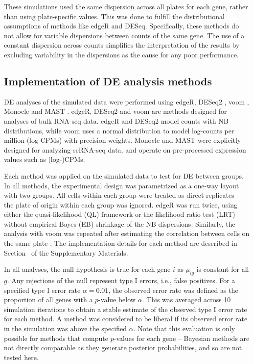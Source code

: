 \documentclass[oupdraft]{bio}
\begin{document}
These simulations used the same dispersion across all plates for each gene, rather than using plate-specific values.
This was done to fulfill the distributional assumptions of methods like edgeR and DESeq.
Specifically, these methods do not allow for variable dispersions between counts of the same gene.
The use of a constant dispersion across counts simplifies the interpretation of the results by excluding variability in the dispersions as the cause for any poor performance.

\subsection{Implementation of DE analysis methods}
DE analyses of the simulated data were performed using edgeR, DESeq2 \citep{love2014moderated}, voom \citep{law2014voom}, Monocle and MAST \citep{finak2015mast}.
edgeR, DESeq2 and voom are methods designed for analyses of bulk RNA-seq data.
edgeR and DESeq2 model counts with NB distributions, while voom uses a normal distribution to model log-counts per million (log-CPMs) with precision weights.
Monocle and MAST were explicitly designed for analyzing scRNA-seq data, and operate on pre-processed expression values such as (log-)CPMs.

Each method was applied on the simulated data to test for DE between groups. 
In all methods, the experimental design was parametrized as a one-way layout with two groups.
All cells within each group were treated as direct replicates -- the plate of origin within each group was ignored.
edgeR was run twice, using either the quasi-likelihood (QL) framework \citep{lund2012detecting} 
    or the likelihood ratio test (LRT) \citep{mccarthy2012differential} without empirical Bayes (EB) shrinkage of the NB dispersions.
Similarly, the analysis with voom was repeated after estimating the correlation between cells on the same plate \citep{smyth2005use}.
The implementation details for each method are described in Section~\suppimplementation{} of the Supplementary Materials.

In all analyses, the null hypothesis is true for each gene $i$ as $\mu_{ig}$ is constant for all $g$.
Any rejections of the null represent type I errors, i.e., false positives.
For a specified type I error rate $\alpha = 0.01$, the observed error rate was defined as the proportion of all genes with a $p$-value below $\alpha$.
This was averaged across 10 simulation iterations to obtain a stable estimate of the observed type I error rate for each method. 
A method was considered to be liberal if its observed error rate in the simulation was above the specified $\alpha$.
Note that this evaluation is only possible for methods that compute $p$-values for each gene -- 
    Bayesian methods \citep{kharchenko2014bayesian} are not directly comparable as they generate posterior probabilities, and so are not tested here.
\end{document}
